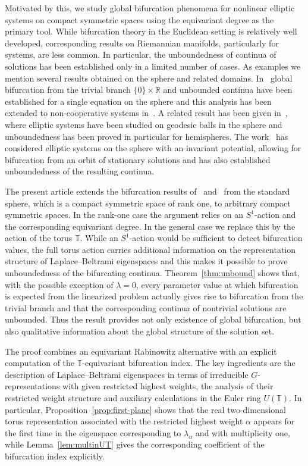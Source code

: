 \documentclass[reqno,twoside,12pt]{amsart}
\newcommand{\bR}{\mathbb{R}}
\newcommand{\bT}{\mathbb{T}}
\numberwithin{equation}{section} \errorcontextlines=0
\begin{document}
Motivated by this, we study global bifurcation phenomena for nonlinear elliptic systems on compact symmetric spaces using the equivariant degree as the primary tool. While bifurcation theory in the Euclidean setting is relatively well developed, corresponding results on Riemannian manifolds, particularly for systems, are less common. In particular, the unboundedness of continua of solutions has been established only in a limited number of cases. As examples we mention several results obtained on the sphere and related domains.
In~\cite{RybickiLB} global bifurcation from the trivial branch $\{0\} \times \bR$ and unbounded continua have been established for a single equation on the sphere and this analysis has been extended to non-cooperative systems in~\cite{RybSte2015}. A related result has been given in~\cite{RybShiSte}, where elliptic systems have been studied on geodesic balls in the sphere and unboundedness has been proved in particular for hemispheres. The work~\cite{GolSte2021} has considered elliptic systems on the sphere with an invariant potential, allowing for bifurcation from an orbit of stationary solutions and has also established unboundedness of the resulting continua.

The present article extends the bifurcation results of~\cite{RybickiLB} and~\cite{RybSte2015} from the standard sphere, which is a compact symmetric space of rank one, to arbitrary compact symmetric spaces. In the rank-one case the argument relies on an $S^1$-action and the corresponding equivariant degree. In the general case we replace this by the action of the torus $\bT$. While an $S^1$-action would be sufficient to detect bifurcation values, the full torus action carries additional information on the representation structure of Laplace--Beltrami eigenspaces and this makes it possible to prove unboundedness of the bifurcating continua. Theorem~\ref{thm:unbound} shows that, with the possible exception of $\lambda=0$, every parameter value at which bifurcation is expected from the linearized problem actually gives rise to bifurcation from the trivial branch and that the corresponding continua of nontrivial solutions are unbounded. Thus the result provides not only existence of global bifurcation, but also qualitative information about the global structure of the solution set.

The proof combines an equivariant Rabinowitz alternative with an explicit computation of the $\bT$-equivariant bifurcation index. The key ingredients are the description of Laplace--Beltrami eigenspaces in terms of irreducible $G$-representations with given restricted highest weights, the analysis of their restricted weight structure and auxiliary calculations in the Euler ring $U(\bT)$. In particular, Proposition~\ref{prop:first-plane} shows that the real two-dimensional torus representation associated with the restricted highest weight $\alpha$ appears for the first time in the eigenspace corresponding to $\lambda_\alpha$ and with multiplicity one, while Lemma~\ref{lem:multinUT} gives the corresponding coefficient of the bifurcation index explicitly.
\end{document}
